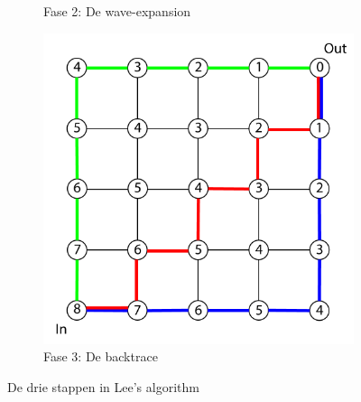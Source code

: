 \documentclass{report}
\begin{document}
\begin{figure}[H]
\begin{subfigure}{0.32\textwidth}
		\caption{Fase 2: De wave-expansion}
		\label{fig:lee-wave}
	\end{subfigure}
	\begin{subfigure}{0.32\textwidth}
		\centering
		\includegraphics[width=\textwidth]{resource/path.png}
		\caption{Fase 3: De backtrace}
		\label{fig:lee-path}
	\end{subfigure}
	\caption{De drie stappen in Lee's algorithm}
	\label{fig:lee}
\end{figure}
\end{document}
